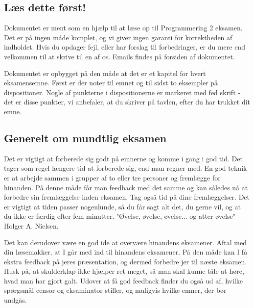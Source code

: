 \subsection{Læs dette først!}

Dokumentet er ment som en hjælp til at læse op til Programmering 2 eksamen. Det er på ingen måde komplet, og vi giver ingen garanti for korrektheden af indholdet. Hvis du opdager fejl, eller har forslag til forbedringer, er du mere end velkommen til at skrive til en af os. Emails findes på forsiden af dokumentet.

Dokumentet er opbygget på den måde at det er et kapitel for hvert eksamensemne. Først er der noter til emnet og til sidst to eksempler på dispositioner. Nogle af punkterne i dispositionerne er markeret med fed skrift - det er disse punkter, vi anbefaler, at du skriver på tavlen, efter du har trukket dit emne.

\subsection{Generelt om mundtlig eksamen}
Det er vigtigt at forberede sig godt på emnerne og komme i gang i god tid. Det tager som regel længere tid at forberede sig, end man regner med. En god teknik er at arbejde sammen i grupper af to eller tre personer og fremlægge for hinanden. På denne måde får man feedback med det samme og kan således nå at forbedre sin fremlæggelse inden eksamen. Tag også tid på dine fremlæggelser. Det er vigtigt at tiden passer nogenlunde, så du får sagt alt det, du gerne vil, og at du ikke er færdig efter fem minutter. "Øvelse, øvelse, øvelse... og atter øvelse" - Holger A. Nielsen.

Det kan derudover være en god ide at overvære hinandens eksamener. Aftal med din læsemakker, at I går med ind til hinandens eksamener. På den måde kan I få ekstra feedback på jeres præsentation, og dermed forbedre jer til næste eksamen. Husk på, at skulderklap ikke hjælper ret meget, så man skal kunne tåle at høre, hvad man har gjort galt. Udover at få god feedback finder du også ud af, hvilke spørgsmål censor og eksaminator stiller, og muligvis hvilke emner, der bør undgås.

